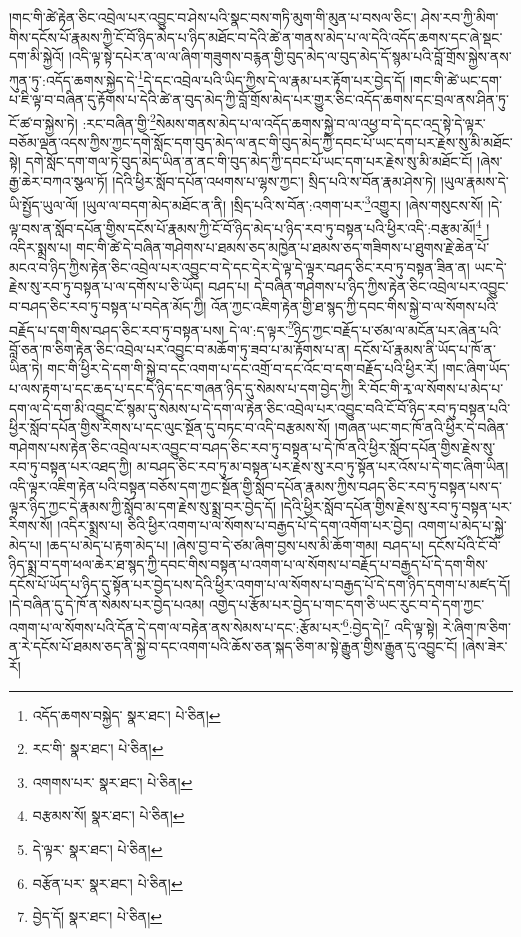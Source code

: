 །གང་གི་ཚེ་རྟེན་ཅིང་འབྲེལ་པར་འབྱུང་བ་ཤེས་པའི་སྣང་བས་གཏི་མུག་གི་མུན་པ་བསལ་ཅིང་། ཤེས་རབ་ཀྱི་མིག་གིས་དངོས་པོ་རྣམས་ཀྱི་ངོ་བོ་ཉིད་མེད་པ་ཉིད་མཐོང་བ་དེའི་ཚེ་ན་གནས་མེད་པ་ལ་དེའི་འདོད་ཆགས་དང་ཞེ་སྡང་དག་མི་སྐྱེའོ། །འདི་ལྟ་སྟེ་དཔེར་ན་ལ་ལ་ཞིག་གཟུགས་བརྙན་གྱི་བུད་མེད་ལ་བུད་མེད་དོ་སྙམ་པའི་བློ་གྲོས་སྐྱེས་ནས་ཀུན་ཏུ་:འདོད་ཆགས་སྐྱེད་དེ་\footnote{འདོད་ཆགས་བསྐྱེད་  སྣར་ཐང་།  པེ་ཅིན། }དེ་དང་འབྲེལ་པའི་ཡིད་ཀྱིས་དེ་ལ་རྣམ་པར་རྟོག་པར་བྱེད་དོ། །གང་གི་ཚེ་ཡང་དག་པ་ཇི་ལྟ་བ་བཞིན་དུ་རྟོགས་པ་དེའི་ཚེ་ན་བུད་མེད་ཀྱི་བློ་གྲོས་མེད་པར་གྱུར་ཅིང་འདོད་ཆགས་དང་བྲལ་ནས་ཤིན་ཏུ་ངོ་ཚ་བ་སྐྱེས་ཏེ། :རང་བཞིན་གྱི་\footnote{རང་གི་  སྣར་ཐང་།  པེ་ཅིན། }སེམས་གནས་མེད་པ་ལ་འདོད་ཆགས་སྐྱེ་བ་ལ་འཕྱ་བ་དེ་དང་འདྲ་སྟེ་དེ་ལྟར་བཅོམ་ལྡན་འདས་ཀྱིས་ཀྱང་དགེ་སློང་དག་བུད་མེད་ལ་ནང་གི་བུད་མེད་ཀྱི་དབང་པོ་ཡང་དག་པར་རྗེས་སུ་མི་མཐོང་སྟེ། དགེ་སློང་དག་གལ་ཏེ་བུད་མེད་ཡིན་ན་ནང་གི་བུད་མེད་ཀྱི་དབང་པོ་ཡང་དག་པར་རྗེས་སུ་མི་མཐོང་ངོ། །ཞེས་རྒྱ་ཆེར་བཀའ་སྩལ་ཏོ། །དེའི་ཕྱིར་སློབ་དཔོན་འཕགས་པ་ལྷས་ཀྱང་། སྲིད་པའི་ས་བོན་རྣམ་ཤེས་ཏེ། །ཡུལ་རྣམས་དེ་ཡི་སྤྱོད་ཡུལ་ལོ། །ཡུལ་ལ་བདག་མེད་མཐོང་ན་ནི། །སྲིད་པའི་ས་བོན་:འགག་པར་\footnote{འགགས་པར་  སྣར་ཐང་།  པེ་ཅིན། }འགྱུར། །ཞེས་གསུངས་སོ། །དེ་ལྟ་བས་ན་སློབ་དཔོན་གྱིས་དངོས་པོ་རྣམས་ཀྱི་ངོ་བོ་ཉིད་མེད་པ་ཉིད་རབ་ཏུ་བསྟན་པའི་ཕྱིར་འདི་:བརྩམ་མོ།\footnote{བརྩམས་སོ།  སྣར་ཐང་།  པེ་ཅིན། } །འདིར་སྨྲས་པ། གང་གི་ཚེ་དེ་བཞིན་གཤེགས་པ་ཐམས་ཅད་མཁྱེན་པ་ཐམས་ཅད་གཟིགས་པ་ཐུགས་རྗེ་ཆེན་པོ་མངའ་བ་ཉིད་ཀྱིས་རྟེན་ཅིང་འབྲེལ་པར་འབྱུང་བ་དེ་དང་དེར་དེ་ལྟ་དེ་ལྟར་བཤད་ཅིང་རབ་ཏུ་བསྟན་ཟིན་ན། ཡང་དེ་རྗེས་སུ་རབ་ཏུ་བསྟན་པ་ལ་དགོས་པ་ཅི་ཡོད། བཤད་པ། དེ་བཞིན་གཤེགས་པ་ཉིད་ཀྱིས་རྟེན་ཅིང་འབྲེལ་པར་འབྱུང་བ་བཤད་ཅིང་རབ་ཏུ་བསྟན་པ་བདེན་མོད་ཀྱི། འོན་ཀྱང་འཇིག་རྟེན་གྱི་ཐ་སྙད་ཀྱི་དབང་གིས་སྐྱེ་བ་ལ་སོགས་པའི་བརྗོད་པ་དག་གིས་བཤད་ཅིང་རབ་ཏུ་བསྟན་པས། དེ་ལ་:ད་ལྟར་\footnote{དེ་ལྟར་  སྣར་ཐང་།  པེ་ཅིན། }ཉིད་ཀྱང་བརྗོད་པ་ཙམ་ལ་མངོན་པར་ཞེན་པའི་བློ་ཅན་ཁ་ཅིག་རྟེན་ཅིང་འབྲེལ་པར་འབྱུང་བ་མཆོག་ཏུ་ཟབ་པ་མ་རྟོགས་པ་ན། དངོས་པོ་རྣམས་ནི་ཡོད་པ་ཁོ་ན་ཡིན་ཏེ། གང་གི་ཕྱིར་དེ་དག་གི་སྐྱེ་བ་དང་འགག་པ་དང་འགྲོ་བ་དང་འོང་བ་དག་བརྗོད་པའི་ཕྱིར་རོ། །གང་ཞིག་ཡོད་པ་ལས་རྟག་པ་དང་ཆད་པ་དང་དེ་ཉིད་དང་གཞན་ཉིད་དུ་སེམས་པ་དག་བྱེད་ཀྱི། རི་བོང་གི་རྭ་ལ་སོགས་པ་མེད་པ་དག་ལ་དེ་དག་མི་འབྱུང་ངོ་སྙམ་དུ་སེམས་པ་དེ་དག་ལ་རྟེན་ཅིང་འབྲེལ་པར་འབྱུང་བའི་ངོ་བོ་ཉིད་རབ་ཏུ་བསྟན་པའི་ཕྱིར་སློབ་དཔོན་གྱིས་རིགས་པ་དང་ལུང་སྔོན་དུ་བཏང་བ་འདི་བརྩམས་སོ། །གཞན་ཡང་གང་ཁོ་ནའི་ཕྱིར་དེ་བཞིན་གཤེགས་པས་རྟེན་ཅིང་འབྲེལ་པར་འབྱུང་བ་བཤད་ཅིང་རབ་ཏུ་བསྟན་པ་དེ་ཁོ་ནའི་ཕྱིར་སློབ་དཔོན་གྱིས་རྗེས་སུ་རབ་ཏུ་བསྟན་པར་འཐད་ཀྱི། མ་བཤད་ཅིང་རབ་ཏུ་མ་བསྟན་པར་རྗེས་སུ་རབ་ཏུ་སྟོན་པར་འོས་པ་དེ་གང་ཞིག་ཡིན། འདི་ལྟར་འཇིག་རྟེན་པའི་བསྟན་བཅོས་དག་ཀྱང་སྔོན་གྱི་སློབ་དཔོན་རྣམས་ཀྱིས་བཤད་ཅིང་རབ་ཏུ་བསྟན་པས་ད་ལྟར་ཉིད་ཀྱང་དེ་རྣམས་ཀྱི་སློབ་མ་དག་རྗེས་སུ་སྨྲ་བར་བྱེད་དོ། །དེའི་ཕྱིར་སློབ་དཔོན་གྱིས་རྗེས་སུ་རབ་ཏུ་བསྟན་པར་རིགས་སོ། །འདིར་སྨྲས་པ། ཅིའི་ཕྱིར་འགག་པ་ལ་སོགས་པ་བརྒྱད་པོ་དེ་དག་འགོག་པར་བྱེད། འགག་པ་མེད་པ་སྐྱེ་མེད་པ། །ཆད་པ་མེད་པ་རྟག་མེད་པ། །ཞེས་བྱ་བ་དེ་ཙམ་ཞིག་བྱས་པས་མི་ཆོག་གམ། བཤད་པ། དངོས་པོའི་ངོ་བོ་ཉིད་སྨྲ་བ་དག་ཕལ་ཆེར་ཐ་སྙད་ཀྱི་དབང་གིས་བསྟན་པ་འགག་པ་ལ་སོགས་པ་བརྗོད་པ་བརྒྱད་པོ་དེ་དག་གིས་དངོས་པོ་ཡོད་པ་ཉིད་དུ་སྟོན་པར་བྱེད་པས་དེའི་ཕྱིར་འགག་པ་ལ་སོགས་པ་བརྒྱད་པོ་དེ་དག་ཉིད་དགག་པ་མཛད་དོ། །དེ་བཞིན་དུ་དེ་ཁོ་ན་སེམས་པར་བྱེད་པའམ། འགྱེད་པ་རྩོམ་པར་བྱེད་པ་གང་དག་ཅི་ཡང་རུང་བ་དེ་དག་ཀྱང་འགག་པ་ལ་སོགས་པའི་དོན་དེ་དག་ལ་བརྟེན་ནས་སེམས་པ་དང་:རྩོམ་པར་\footnote{བརྩོན་པར་  སྣར་ཐང་།  པེ་ཅིན། }:བྱེད་དེ།\footnote{བྱེད་དོ།  སྣར་ཐང་།  པེ་ཅིན། } འདི་ལྟ་སྟེ། རེ་ཞིག་ཁ་ཅིག་ན་རེ་དངོས་པོ་ཐམས་ཅད་ནི་སྐྱེ་བ་དང་འགག་པའི་ཆོས་ཅན་སྐད་ཅིག་མ་སྟེ་རྒྱུན་གྱིས་རྒྱུན་དུ་འབྱུང་ངོ། །ཞེས་ཟེར་རོ། 